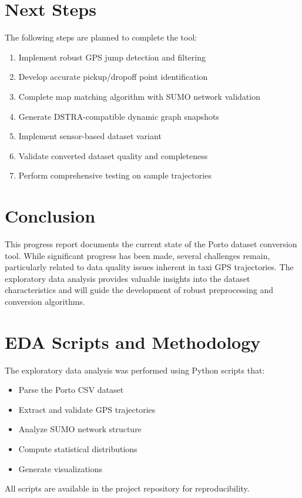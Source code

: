 \documentclass[11pt,a4paper]{article}
\begin{document}
\section{Next Steps}

The following steps are planned to complete the tool:

\begin{enumerate}
    \item Implement robust GPS jump detection and filtering
    \item Develop accurate pickup/dropoff point identification
    \item Complete map matching algorithm with SUMO network validation
    \item Generate DSTRA-compatible dynamic graph snapshots
    \item Implement sensor-based dataset variant
    \item Validate converted dataset quality and completeness
    \item Perform comprehensive testing on sample trajectories
\end{enumerate}

\section{Conclusion}

This progress report documents the current state of the Porto dataset conversion tool. While significant progress has been made, several challenges remain, particularly related to data quality issues inherent in taxi GPS trajectories. The exploratory data analysis provides valuable insights into the dataset characteristics and will guide the development of robust preprocessing and conversion algorithms.

\appendix

\section{EDA Scripts and Methodology}

The exploratory data analysis was performed using Python scripts that:
\begin{itemize}
    \item Parse the Porto CSV dataset
    \item Extract and validate GPS trajectories
    \item Analyze SUMO network structure
    \item Compute statistical distributions
    \item Generate visualizations
\end{itemize}

All scripts are available in the project repository for reproducibility.
\end{document}
